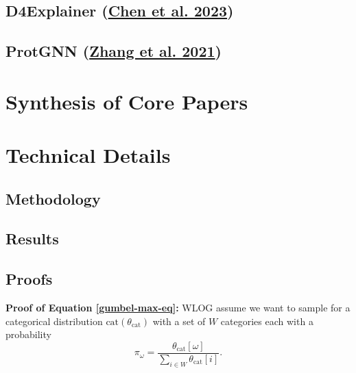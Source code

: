 \documentclass[
  11pt,
  letterpaper,
]{article}
\begin{document}
\hypertarget{d4explainer-chen_wu_gupta_ying_2023}{%
\subsection{\texorpdfstring{D4Explainer
(\protect\hyperlink{ref-Chen_Wu_Gupta_Ying_2023}{Chen et al.
2023})}{D4Explainer (Chen et al. 2023)}}\label{d4explainer-chen_wu_gupta_ying_2023}}

\hypertarget{protgnn-zhang_liu_wang_lu_lee_2021}{%
\subsection{\texorpdfstring{ProtGNN
(\protect\hyperlink{ref-Zhang_Liu_Wang_Lu_Lee_2021}{Zhang et al.
2021})}{ProtGNN (Zhang et al. 2021)}}\label{protgnn-zhang_liu_wang_lu_lee_2021}}

\hypertarget{synthesis-of-core-papers}{%
\section{Synthesis of Core Papers}\label{synthesis-of-core-papers}}

\hypertarget{technical-details}{%
\section{Technical Details}\label{technical-details}}

\hypertarget{methodology}{%
\subsection{Methodology}\label{methodology}}

\hypertarget{results}{%
\subsection{Results}\label{results}}

\hypertarget{sec-proof}{%
\subsection{Proofs}\label{sec-proof}}

\textbf{Proof of Equation \ref{gumbel-max-eq}:} WLOG assume we want to
sample for a categorical distribution \(\text{cat}(\theta_\text{cat})\)
with a set of \(W\) categories each with a probability \[
\pi_\omega = \dfrac{\theta_\text{cat}[\omega]}{\sum_{i \in W}\theta_\text{cat}[i]}.
\]
\end{document}
